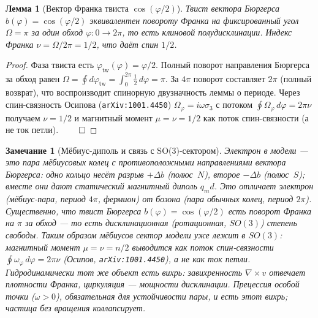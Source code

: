 \documentclass[12pt,a4paper]{article}
\newtheorem{lemma}{Лемма}
\newtheorem{remark}{Замечание}
\begin{document}
\begin{lemma}[Вектор Франка твиста $\cos(\varphi/2)$]
\label{lem:franck}
Твист вектора Бюргерса $b(\varphi)=\cos(\varphi/2)$ эквивалентен повороту
Франка на фиксированный угол $\Omega=\pi$ за один обход $\varphi:0\to2\pi$,
то есть клиновой \emph{полудисклинации}. Индекс Франка $\nu=\Omega/2\pi=1/2$,
что даёт спин $1/2$.
\end{lemma}
\begin{proof}
Фаза твиста есть $\varphi_{\text{tw}}(\varphi)=\varphi/2$. Полный поворот
направления Бюргерса за обход равен
$\Omega=\oint d\varphi_{\text{tw}}=\int_0^{2\pi}\tfrac12\,d\varphi=\pi$.
За $4\pi$ поворот составляет $2\pi$ (полный возврат), что воспроизводит
спинорную двузначность леммы о периоде. Через спин-связность Осипова
(\texttt{arXiv:1001.4450}) $\Omega_\varphi=i\omega\sigma_3$ с потоком
$\oint\Omega_\varphi\,d\varphi=2\pi\nu$ получаем $\nu=1/2$ и магнитный момент
$\mu=\nu=1/2$ как поток спин-связности (а не ток петли). $\qed$
\end{proof}

\begin{remark}[Мёбиус-диполь и связь с SO(3)-сектором]
Электрон в модели --- это пара мёбиусовых колец с \emph{противоположными}
направлениями вектора Бюргерса: одно кольцо несёт разрыв $+\Delta b$
(полюс~$N$), второе $-\Delta b$ (полюс~$S$); вместе они дают статический
магнитный диполь $q_m d$. Это отличает электрон (мёбиус-пара, период $4\pi$,
фермион) от бозона (пара обычных колец, период $2\pi$). Существенно, что твист
Бюргерса $b(\varphi)=\cos(\varphi/2)$ есть поворот Франка на $\pi$ за обход ---
то есть \emph{дисклинационная} (ротационная, $SO(3)$) степень свободы. Таким
образом мёбиусов сектор модели \emph{уже} лежит в $SO(3)$: магнитный момент
$\mu=\nu=n/2$ выводится как поток спин-связности $\oint\omega_\varphi
\,d\varphi=2\pi\nu$ (Осипов, \texttt{arXiv:1001.4450}), а не как ток петли.
Гидродинамически тот же объект есть вихрь: завихренность $\nabla\times v$
отвечает плотности Франка, циркуляция --- мощности дисклинации. Прецессия
особой точки ($\omega>0$), обязательная для устойчивости пары, и есть этот
вихрь; частица без вращения коллапсирует.
\end{remark}
\end{document}
